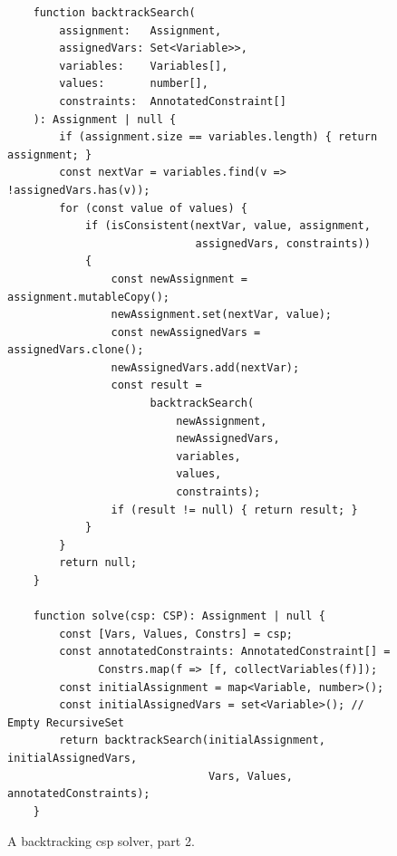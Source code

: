 \begin{figure}[!ht]
\centering
\begin{verbatim}
    function backtrackSearch(
        assignment:   Assignment,
        assignedVars: Set<Variable>>,
        variables:    Variables[],
        values:       number[],
        constraints:  AnnotatedConstraint[]
    ): Assignment | null {   
        if (assignment.size == variables.length) { return assignment; }
        const nextVar = variables.find(v => !assignedVars.has(v));    
        for (const value of values) {
            if (isConsistent(nextVar, value, assignment, 
                             assignedVars, constraints)) 
            {       
                const newAssignment = assignment.mutableCopy();
                newAssignment.set(nextVar, value);    
                const newAssignedVars = assignedVars.clone();
                newAssignedVars.add(nextVar);
                const result = 
                      backtrackSearch(
                          newAssignment, 
                          newAssignedVars, 
                          variables, 
                          values, 
                          constraints);
                if (result != null) { return result; }
            }
        }
        return null;
    }
    
    function solve(csp: CSP): Assignment | null {
        const [Vars, Values, Constrs] = csp;
        const annotatedConstraints: AnnotatedConstraint[] = 
              Constrs.map(f => [f, collectVariables(f)]);
        const initialAssignment = map<Variable, number>();
        const initialAssignedVars = set<Variable>(); // Empty RecursiveSet
        return backtrackSearch(initialAssignment, initialAssignedVars, 
                               Vars, Values, annotatedConstraints);
    }
\end{verbatim}
\vspace*{-0.3cm}
\caption{A backtracking \Gls{csp} solver, part 2.}
\label{fig:CSP-Solver.ipynb-2}
\end{figure}

